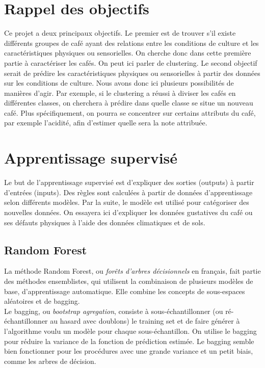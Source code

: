 \section{Rappel des objectifs}\label{obj}
Ce projet a deux principaux objectifs. Le premier est de trouver s'il existe différents groupes de café ayant des relations entre les conditions de culture et les caractéristiques physiques ou sensorielles. On cherche donc dans cette première partie à caractériser les cafés. On peut ici parler de clustering.  Le second objectif serait de prédire les caractéristiques physiques ou sensorielles à partir des données sur les conditions de culture. Nous avons donc ici plusieurs possibilités de manières d'agir. Par exemple, si le clustering a réussi à diviser les cafés en différentes classes, on cherchera à prédire dans quelle classe se situe un nouveau café. Plus spécifiquement, on pourra se concentrer sur certains attributs du café, par exemple l'acidité, afin d'estimer quelle sera la note attribuée. 



\newpage

\section{Apprentissage supervisé}
Le but de l'apprentissage supervisé est d'expliquer des sorties (outputs) à partir d'entrées (inputs). Des règles sont calculées à partir de données d'apprentissage selon différents modèles. Par la suite, le modèle est utilisé pour catégoriser des nouvelles données. On essayera ici d'expliquer les données gustatives du café ou ses défauts physiques à l'aide des données climatiques et de sols. 


\subsection{Random Forest}

La méthode Random Forest, ou \textit{forêts d'arbres décisionnels} en français, fait partie des méthodes ensemblistes\cite{EnsembleMethods}, qui utilisent la combinaison de plusieurs modèles de base, d'apprentissage automatique. Elle combine les concepts de sous-espaces aléatoires et de bagging.\\

Le bagging\label{bagging}, ou \textit{bootstrap agregation}, consiste à sous-échantillonner (ou ré-échantillonner au hasard avec doublons) le training set et de faire générer à l’algorithme voulu un modèle pour chaque sous-échantillon. On utilise le bagging pour réduire la variance de la fonction de prédiction estimée. Le bagging semble bien fonctionner pour les procédures avec une grande variance et un petit biais, comme les arbres de décision. \cite{hastie_09_elements-of.statistical-learning}\\


